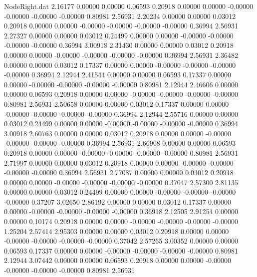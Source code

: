 \begin{filecontents}{NodeRight.dat}
   2.16177    0.00000    0.00000     0.06593    0.20918    0.00000    0.00000   -0.00000   -0.00000   -0.00000   -0.00000    0.80981    2.56931
   2.20234    0.00000    0.00000     0.03012    0.20918    0.00000    0.00000   -0.00000   -0.00000   -0.00000   -0.00000    0.36994    2.56931
   2.27327    0.00000    0.00000     0.03012    0.24499    0.00000    0.00000   -0.00000   -0.00000   -0.00000   -0.00000    0.36994    3.00918
   2.31430    0.00000    0.00000     0.03012    0.20918    0.00000    0.00000   -0.00000   -0.00000   -0.00000   -0.00000    0.36994    2.56931
   2.36482    0.00000    0.00000     0.03012    0.17337    0.00000    0.00000   -0.00000   -0.00000   -0.00000   -0.00000    0.36994    2.12944
   2.41544    0.00000    0.00000     0.06593    0.17337    0.00000    0.00000   -0.00000   -0.00000   -0.00000   -0.00000    0.80981    2.12944
   2.46606    0.00000    0.00000     0.06593    0.20918    0.00000    0.00000   -0.00000   -0.00000   -0.00000   -0.00000    0.80981    2.56931
   2.50658    0.00000    0.00000     0.03012    0.17337    0.00000    0.00000   -0.00000   -0.00000   -0.00000   -0.00000    0.36994    2.12944
   2.55716    0.00000    0.00000     0.03012    0.24499    0.00000    0.00000   -0.00000   -0.00000   -0.00000   -0.00000    0.36994    3.00918
   2.60763    0.00000    0.00000     0.03012    0.20918    0.00000    0.00000   -0.00000   -0.00000   -0.00000   -0.00000    0.36994    2.56931
   2.66908    0.00000    0.00000     0.06593    0.20918    0.00000    0.00000   -0.00000   -0.00000   -0.00000   -0.00000    0.80981    2.56931
   2.71997    0.00000    0.00000     0.03012    0.20918    0.00000    0.00000   -0.00000   -0.00000   -0.00000   -0.00000    0.36994    2.56931
   2.77087    0.00000    0.00000     0.03012    0.20918    0.00000    0.00000   -0.00000   -0.00000   -0.00000   -0.00000    0.37047    2.57300
   2.81135    0.00000    0.00000     0.03012    0.24499    0.00000    0.00000   -0.00000   -0.00000   -0.00000   -0.00000    0.37207    3.02650
   2.86192    0.00000    0.00000     0.03012    0.17337    0.00000    0.00000   -0.00000   -0.00000   -0.00000   -0.00000    0.36918    2.12505
   2.91254    0.00000    0.00000     0.10174    0.20918    0.00000    0.00000   -0.00000   -0.00000   -0.00000   -0.00000    1.25204    2.57414
   2.95303    0.00000    0.00000     0.03012    0.20918    0.00000    0.00000   -0.00000   -0.00000   -0.00000   -0.00000    0.37042    2.57265
   3.00352    0.00000    0.00000     0.06593    0.17337    0.00000    0.00000   -0.00000   -0.00000   -0.00000   -0.00000    0.80981    2.12944
   3.07442    0.00000    0.00000     0.06593    0.20918    0.00000    0.00000   -0.00000   -0.00000   -0.00000   -0.00000    0.80981    2.56931

\end{filecontents}
